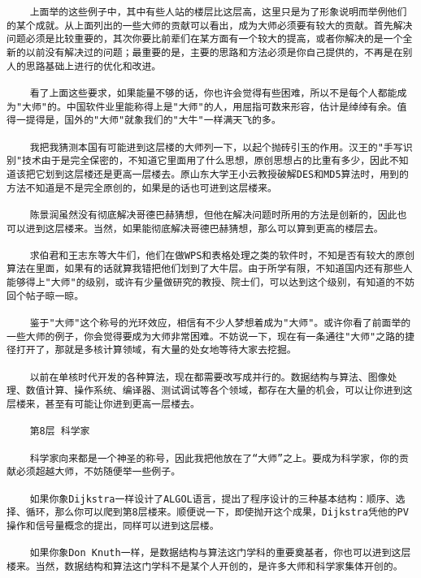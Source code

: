 \begin{verbatim}
    上面举的这些例子中，其中有些人站的楼层比这层高，这里只是为了形象说明而举例他们的某个成就。从上面列出的一些大师的贡献可以看出，成为大师必须要有较大的贡献。首先解决问题必须是比较重要的，其次你要比前辈们在某方面有一个较大的提高，或者你解决的是一个全新的以前没有解决过的问题；最重要的是，主要的思路和方法必须是你自己提供的，不再是在别人的思路基础上进行的优化和改进。

    看了上面这些要求，如果能量不够的话，你也许会觉得有些困难，所以不是每个人都能成为"大师"的。中国软件业里能称得上是"大师"的人，用屈指可数来形容，估计是绰绰有余。值得一提得是，国外的"大师"就象我们的"大牛"一样满天飞的多。

    我把我猜测本国有可能进到这层楼的大师列一下，以起个抛砖引玉的作用。汉王的"手写识别"技术由于是完全保密的，不知道它里面用了什么思想，原创思想占的比重有多少，因此不知道该把它划到这层楼还是更高一层楼去。原山东大学王小云教授破解DES和MD5算法时，用到的方法不知道是不是完全原创的，如果是的话也可进到这层楼来。

    陈景润虽然没有彻底解决哥德巴赫猜想，但他在解决问题时所用的方法是创新的，因此也可以进到这层楼来。当然，如果能彻底解决哥德巴赫猜想，那么可以算到更高的楼层去。

    求伯君和王志东等大牛们，他们在做WPS和表格处理之类的软件时，不知是否有较大的原创算法在里面，如果有的话就算我错把他们划到了大牛层。由于所学有限，不知道国内还有那些人能够得上"大师"的级别，或许有少量做研究的教授、院士们，可以达到这个级别，有知道的不妨回个帖子晾一晾。

    鉴于"大师"这个称号的光环效应，相信有不少人梦想着成为"大师"。或许你看了前面举的一些大师的例子，你会觉得要成为大师非常困难。不妨说一下，现在有一条通往"大师"之路的捷径打开了，那就是多核计算领域，有大量的处女地等待大家去挖掘。

    以前在单核时代开发的各种算法，现在都需要改写成并行的。数据结构与算法、图像处理、数值计算、操作系统、编译器、测试调试等各个领域，都存在大量的机会，可以让你进到这层楼来，甚至有可能让你进到更高一层楼去。

    第8层 科学家

    科学家向来都是一个神圣的称号，因此我把他放在了“大师”之上。要成为科学家，你的贡献必须超越大师，不妨随便举一些例子。

    如果你象Dijkstra一样设计了ALGOL语言，提出了程序设计的三种基本结构：顺序、选择、循环，那么你可以爬到第8层楼来。顺便说一下，即使抛开这个成果，Dijkstra凭他的PV操作和信号量概念的提出，同样可以进到这层楼。

    如果你象Don Knuth一样，是数据结构与算法这门学科的重要奠基者，你也可以进到这层楼来。当然，数据结构和算法这门学科不是某个人开创的，是许多大师和科学家集体开创的。


\end{verbatim}
